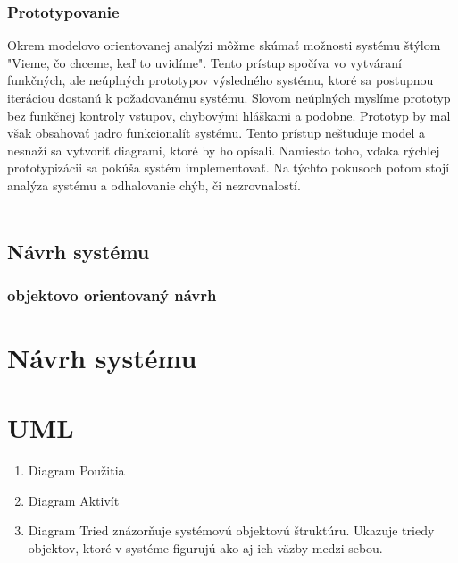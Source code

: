 \subsubsection{Prototypovanie}
Okrem modelovo orientovanej analýzi môžme skúmať možnosti systému štýlom "Vieme, čo chceme, keď to uvidíme". Tento prístup spočíva vo vytváraní funkčných, ale neúplných prototypov výsledného systému, ktoré sa postupnou iteráciou dostanú k požadovanému systému. Slovom neúplných myslíme prototyp bez funkčnej kontroly vstupov, chybovými hláškami a podobne. Prototyp by mal však obsahovať jadro funkcionalít systému. Tento prístup neštuduje model a nesnaží sa vytvoriť diagrami, ktoré by ho opísali. Namiesto toho, vďaka rýchlej prototypizácii sa pokúša systém implementovať. Na týchto pokusoch potom stojí analýza systému a odhalovanie chýb, či nezrovnalostí. \\\\

\subsection{Návrh systému}
\subsubsection{objektovo orientovaný návrh}
  


\section{Návrh systému}


\section{UML}
\begin{enumerate}
	\item Diagram Použitia
	\item Diagram Aktivít
	\item Diagram Tried znázorňuje systémovú objektovú štruktúru. Ukazuje triedy objektov, ktoré v systéme figurujú ako aj ich väzby medzi sebou.
\end{enumerate}

